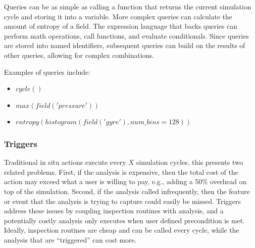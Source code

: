 Queries can be as simple as calling a function that returns the current simulation cycle
and storing it into a variable.
%
More complex queries can calculate the amount of entropy of a field.
%
The expression language that backs queries can perform math operations,
call functions, and evaluate conditionals.
%
Since queries are stored into named identifiers, subsequent queries
can build on the results of other queries, allowing for complex combinations.

Examples of queries include:
\begin{itemize}
\item $cycle()$
\item $max(field('pressure'))$
\item $entropy(histogram(field('gyre'), num\_bins=128))$
\end{itemize}
%

%
%

\subsubsection{Triggers}
Traditional in situ actions execute every $X$ simulation cycles, this presents
two related problems.
%
First, if the analysis is expensive, then the total cost of the action may exceed
what a user is willing to pay, e.g., adding a 50\% overhead on top of the simulation.
%
Second, if the analysis called infrequently, then the feature or event that the analysis is
trying to capture could easily be missed.
%
Triggers address these issues by coupling inspection routines with analysis, and a
potentially costly analysis only executes when user defined precondition is met.
%
Ideally, inspection routines are cheap and can be called every cycle, while the analysis
that are ``triggered'' can cost more.

